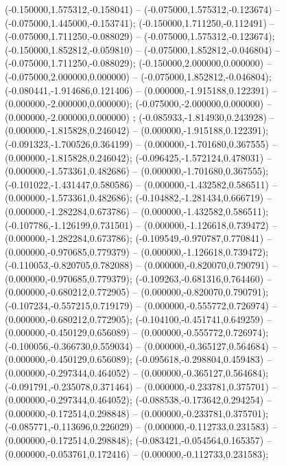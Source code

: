  (-0.150000,1.575312,-0.158041) -- (-0.075000,1.575312,-0.123674) -- (-0.075000,1.445000,-0.153741);
 (-0.150000,1.711250,-0.112491) -- (-0.075000,1.711250,-0.088029) -- (-0.075000,1.575312,-0.123674);
 (-0.150000,1.852812,-0.059810) -- (-0.075000,1.852812,-0.046804) -- (-0.075000,1.711250,-0.088029);
 (-0.150000,2.000000,0.000000) -- (-0.075000,2.000000,0.000000) -- (-0.075000,1.852812,-0.046804);
 (-0.080441,-1.914686,0.121406) -- (0.000000,-1.915188,0.122391) -- (0.000000,-2.000000,0.000000);
 (-0.075000,-2.000000,0.000000) -- (0.000000,-2.000000,0.000000) ;
 (-0.085933,-1.814930,0.243928) -- (0.000000,-1.815828,0.246042) -- (0.000000,-1.915188,0.122391);
 (-0.091323,-1.700526,0.364199) -- (0.000000,-1.701680,0.367555) -- (0.000000,-1.815828,0.246042);
 (-0.096425,-1.572124,0.478031) -- (0.000000,-1.573361,0.482686) -- (0.000000,-1.701680,0.367555);
 (-0.101022,-1.431447,0.580586) -- (0.000000,-1.432582,0.586511) -- (0.000000,-1.573361,0.482686);
 (-0.104882,-1.281434,0.666719) -- (0.000000,-1.282284,0.673786) -- (0.000000,-1.432582,0.586511);
 (-0.107786,-1.126199,0.731501) -- (0.000000,-1.126618,0.739472) -- (0.000000,-1.282284,0.673786);
 (-0.109549,-0.970787,0.770841) -- (0.000000,-0.970685,0.779379) -- (0.000000,-1.126618,0.739472);
 (-0.110053,-0.820705,0.782088) -- (0.000000,-0.820070,0.790791) -- (0.000000,-0.970685,0.779379);
 (-0.109263,-0.681316,0.764460) -- (0.000000,-0.680212,0.772905) -- (0.000000,-0.820070,0.790791);
 (-0.107234,-0.557215,0.719179) -- (0.000000,-0.555772,0.726974) -- (0.000000,-0.680212,0.772905);
 (-0.104100,-0.451741,0.649259) -- (0.000000,-0.450129,0.656089) -- (0.000000,-0.555772,0.726974);
 (-0.100056,-0.366730,0.559034) -- (0.000000,-0.365127,0.564684) -- (0.000000,-0.450129,0.656089);
 (-0.095618,-0.298804,0.459483) -- (0.000000,-0.297344,0.464052) -- (0.000000,-0.365127,0.564684);
 (-0.091791,-0.235078,0.371464) -- (0.000000,-0.233781,0.375701) -- (0.000000,-0.297344,0.464052);
 (-0.088538,-0.173642,0.294254) -- (0.000000,-0.172514,0.298848) -- (0.000000,-0.233781,0.375701);
 (-0.085771,-0.113696,0.226029) -- (0.000000,-0.112733,0.231583) -- (0.000000,-0.172514,0.298848);
 (-0.083421,-0.054564,0.165357) -- (0.000000,-0.053761,0.172416) -- (0.000000,-0.112733,0.231583);

